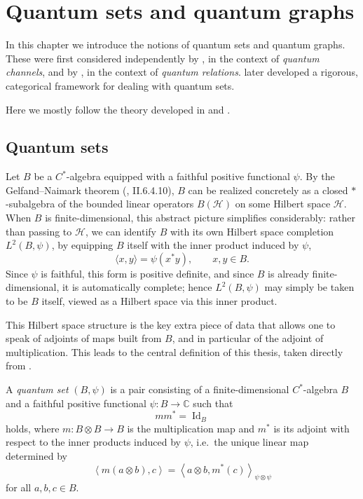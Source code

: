 \chapter{Quantum sets and quantum graphs}
\label{ch:quantum-sets-and-graphs}

In this chapter we introduce the notions of quantum sets and quantum
graphs. These were first considered independently by
\textcite{duan13}, in the context of \emph{quantum channels}, and by
\textcite{weaver2010}, in the context of \emph{quantum relations}.
\textcite{musto18} later developed a rigorous, categorical framework
for dealing with quantum sets.

Here we mostly follow the theory developed in \textcite{tobolski26}
and \textcite{gromada22}.

\section{Quantum sets}
\label{sec:quantum-sets}

Let \( B \) be a \( C^{*} \)-algebra equipped with a faithful positive
functional \( \psi \). By the Gelfand--Naimark  theorem
(\textcite{blackadar}, II.6.4.10), \( B \) can be
realized concretely as a closed \( * \)-subalgebra of the bounded linear
operators \( B(\mathcal{H}) \) on some Hilbert space \( \mathcal{H} \).
When \( B \) is finite-dimensional, this abstract picture simplifies
considerably: rather than passing to \( \mathcal{H} \), we can
identify \( B \) with its own Hilbert space completion \( L^2(B,\psi) \),
by equipping \( B \) itself with the inner product induced by \( \psi \),
\[
    \langle x, y \rangle = \psi(x^{*}y), \qquad x, y \in B.
\]
Since \( \psi \) is faithful, this form is positive definite, and since
\( B \) is already finite-dimensional, it is automatically complete;
hence \( L^2(B,\psi) \) may simply be taken to be \( B \) itself, viewed
as a Hilbert space via this inner product.

This Hilbert space structure is the key extra piece of data that allows
one to speak of adjoints of maps built from \( B \), and in particular of
the adjoint of multiplication. This leads to the central definition of
this thesis, taken directly from \textcite{tobolski26}.

\begin{definition}
    \label{def:quantum-set}
    A \emph{quantum set} \( (B, \psi) \) is a pair consisting of a
    finite-dimensional \( C^{*} \)-algebra \( B \) and a faithful positive
    functional \( \psi \colon B \rightarrow \mathbb{C} \) such that
    \[
        m m^{*} = \operatorname{Id}_{B}
    \]
    holds, where \( m \colon B \otimes B \rightarrow B \) is the
    multiplication map and \( m^{*} \) is its adjoint with respect to the
    inner products induced by \( \psi \), i.e.\ the unique linear map
    determined by
    \[
        \left\langle m(a \otimes b), c \right\rangle
        = \left\langle a \otimes b, m^{*}(c) \right\rangle_{\psi \otimes \psi}
    \]
    for all \( a, b, c \in B \).
\end{definition}


